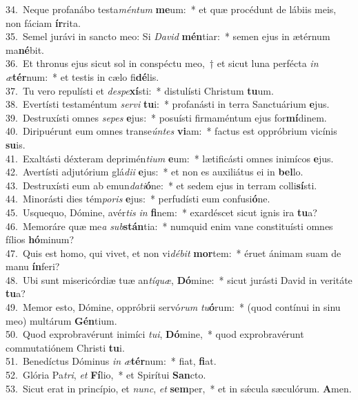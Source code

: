 {34.~}Neque profanábo testa\textit{mén}\textit{tum} \textbf{me}um:~* et quæ procédunt de lábiis meis, non fáciam \textbf{ír}rita.\\
{35.~}Semel jurávi in sancto meo: Si \textit{Da}\textit{vid} \textbf{mén}tiar:~* semen ejus in ætérnum ma\textbf{né}bit.\\
{36.~}Et thronus ejus sicut sol in conspéctu meo,~† et sicut luna perfécta \textit{in} \textit{æ}\textbf{tér}num:~* et testis in cælo fi\textbf{dé}lis.\\
{37.~}Tu vero repulísti et \textit{de}\textit{spe}\textbf{xí}sti:~* distulísti Christum \textbf{tu}um.\\
{38.~}Evertísti testaméntum \textit{ser}\textit{vi} \textbf{tu}i:~* profanásti in terra Sanctuárium \textbf{e}jus.\\
{39.~}Destruxísti omnes \textit{se}\textit{pes} \textbf{e}jus:~* posuísti firmaméntum ejus for\textbf{mí}dinem.\\
{40.~}Diripuérunt eum omnes transe\textit{ún}\textit{tes} \textbf{vi}am:~* factus est oppróbrium vicínis \textbf{su}is.\\
{41.~}Exaltásti déxteram deprimén\textit{ti}\textit{um} \textbf{e}um:~* lætificásti omnes inimícos \textbf{e}jus.\\
{42.~}Avertísti adjutórium glá\textit{di}\textit{i} \textbf{e}jus:~* et non es auxiliátus ei in \textbf{bel}lo.\\
{43.~}Destruxísti eum ab emun\textit{da}\textit{ti}\textbf{ó}ne:~* et sedem ejus in terram colli\textbf{sí}sti.\\
{44.~}Minorásti dies tém\textit{po}\textit{ris} \textbf{e}jus:~* perfudísti eum confusi\textbf{ó}ne.\\
{45.~}Usquequo, Dómine, avér\textit{tis} \textit{in} \textbf{fi}nem:~* exardéscet sicut ignis ira \textbf{tu}a?\\
{46.~}Memoráre quæ me\textit{a} \textit{sub}\textbf{stán}tia:~* numquid enim vane constituísti omnes fílios \textbf{hó}minum?\\
{47.~}Quis est homo, qui vivet, et non vi\textit{dé}\textit{bit} \textbf{mor}tem:~* éruet ánimam suam de manu \textbf{ín}feri?\\
{48.~}Ubi sunt misericórdiæ tuæ an\textit{tí}\textit{quæ}, \textbf{Dó}mine:~* sicut jurásti David in veritáte \textbf{tu}a?\\
{49.~}Memor esto, Dómine, oppróbrii servó\textit{rum} \textit{tu}\textbf{ó}rum:~* (quod contínui in sinu meo) multárum \textbf{Gén}tium.\\
{50.~}Quod exprobravérunt inimíci \textit{tu}\textit{i}, \textbf{Dó}mine,~* quod exprobravérunt commutatiónem Christi \textbf{tu}i.\\
{51.~}Benedíctus Dóminus \textit{in} \textit{æ}\textbf{tér}num:~* fiat, \textbf{fi}at.\\
{52.~}Glória Pa\textit{tri}, \textit{et} \textbf{Fí}lio,~* et Spirítui \textbf{San}cto.\\
{53.~}Sicut erat in princípio, et \textit{nunc}, \textit{et} \textbf{sem}per,~* et in sǽcula sæculórum. \textbf{A}men.\\
